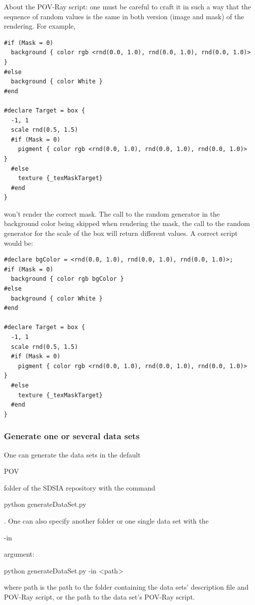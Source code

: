 About the POV-Ray script: one must be careful to craft it in such a way that the sequence of random values is the same in both version (image and mask) of the rendering. For example,
\begin{scriptsize}
\begin{ttfamily}
\begin{verbatim}
#if (Mask = 0)
  background { color rgb <rnd(0.0, 1.0), rnd(0.0, 1.0), rnd(0.0, 1.0)> }
#else
  background { color White }
#end

#declare Target = box {
  -1, 1
  scale rnd(0.5, 1.5)
  #if (Mask = 0)
    pigment { color rgb <rnd(0.0, 1.0), rnd(0.0, 1.0), rnd(0.0, 1.0)> }
  #else
    texture {_texMaskTarget}
  #end
}
\end{verbatim}
\end{ttfamily}
\end{scriptsize}
won't render the correct mask. The call to the random generator in the background color being skipped when rendering the mask, the call to the random generator for the scale of the box will return different values. A correct script would be:
\begin{scriptsize}
\begin{ttfamily}
\begin{verbatim}
#declare bgColor = <rnd(0.0, 1.0), rnd(0.0, 1.0), rnd(0.0, 1.0)>;
#if (Mask = 0)
  background { color rgb bgColor }
#else
  background { color White }
#end

#declare Target = box {
  -1, 1
  scale rnd(0.5, 1.5)
  #if (Mask = 0)
    pigment { color rgb <rnd(0.0, 1.0), rnd(0.0, 1.0), rnd(0.0, 1.0)> }
  #else
    texture {_texMaskTarget}
  #end
}
\end{verbatim}
\end{ttfamily}
\end{scriptsize}

\subsubsection{Generate one or several data sets}

One can generate the data sets in the default \begin{ttfamily}POV\end{ttfamily} folder of the SDSIA repository with the command \begin{ttfamily}python generateDataSet.py\end{ttfamily}. One can also specify another folder or one single data set with the \begin{ttfamily}-in\end{ttfamily} argument: \begin{ttfamily}python generateDataSet.py -in <path>\end{ttfamily} where path is the path to the folder containing the data sets' description file and POV-Ray script, or the path to the data set's POV-Ray script.\\

